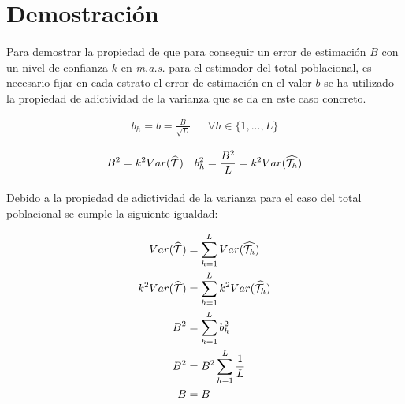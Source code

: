 \documentclass{article}
\begin{document}
  \section{Demostración}

    \paragraph{}
    Para demostrar la propiedad de que para conseguir un error de estimación $B$ con un nivel de confianza $k$ en \emph{m.a.s.} para el estimador del total poblacional, es necesario fijar en cada estrato el error de estimación en el valor $b$ se ha utilizado la propiedad de adictividad de la varianza que se da en este caso concreto.

    \begin{align}
      b_h = b = \frac{B}{\sqrt{L}} && \forall h \in \{1,...,L\}
    \end{align}

    \begin{align}
      B^2 = k^2Var(\widehat{\mathcal{T}}) && b_h^2 = \frac{B^2}{L} = k^2Var(\widehat{\mathcal{T}_h})
    \end{align}

    \paragraph{}
    Debido a la propiedad de adictividad de la varianza para el caso del total poblacional se cumple la siguiente igualdad:

    \begin{align}
      Var(\widehat{\mathcal{T}}) &= \sum\limits_{h=1}^L Var(\widehat{\mathcal{T}_h})\\
      k^2Var(\widehat{\mathcal{T}}) &= \sum\limits_{h=1}^L k^2Var(\widehat{\mathcal{T}_h})\\
      B^2 &= \sum\limits_{h=1}^L b_h^2 \\
      B^2 &= B^2\sum\limits_{h=1}^L \frac{1}{L} \\
      B &= B
    \end{align}

  \nocite{muest2017}
  \nocite{sarndal2003model}

  
  
\end{document}
